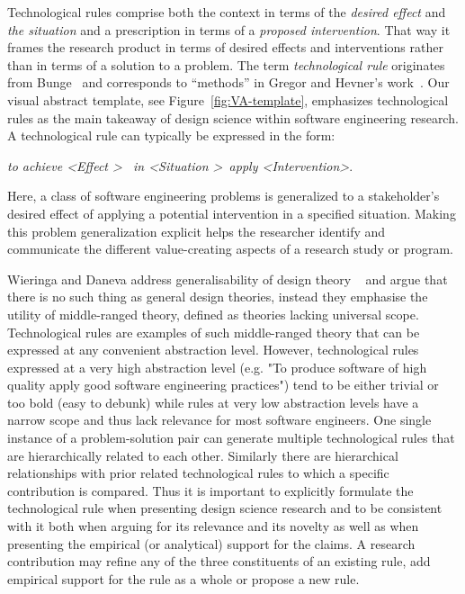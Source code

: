 \documentclass[graybox]{svmult}
\begin{document}
Technological rules comprise both the context in terms of the \emph{desired effect} and \emph{the situation} and a prescription in terms of a \emph{proposed intervention}. That way it frames the research product in terms of desired effects and interventions rather than in terms of a solution to a problem. The term \emph{technological rule} originates from Bunge~\cite{bunge_philosophy_1998} and corresponds to ``methods'' in Gregor and Hevner's work~\cite{gregor_positioning_2013}. Our visual abstract template,  see Figure~\ref{fig:VA-template}, emphasizes technological rules as the main takeaway of design science within software engineering research. A technological rule can typically be expressed in the form: 

\begin{center}{\emph{to achieve \textless Effect \textgreater ~ in \textless Situation \textgreater~apply \textless Intervention\textgreater}.} 
\newline
\end{center}

Here, a class of software engineering problems is generalized to a stakeholder's desired effect of applying a potential intervention in a specified situation. 
Making this problem generalization explicit helps the researcher identify and communicate the different value-creating aspects of a research study or program.


Wieringa and Daneva address generalisability of design theory ~\cite{wieringa_six_2015} and argue that there is no such thing as general design theories, instead they emphasise the utility of middle-ranged theory, defined as theories lacking universal scope. 
Technological rules are examples of such middle-ranged theory that can be expressed at any convenient abstraction level. However, technological rules expressed at a very high abstraction level (e.g. "To produce software of high quality apply good software engineering practices") tend to be either trivial or too bold (easy to debunk) while rules at very low abstraction levels have a narrow scope and thus lack relevance for most software engineers. One single instance of a problem-solution pair can generate multiple technological rules that are hierarchically related to each other. Similarly there are hierarchical relationships with prior related technological rules to which a specific contribution is compared.
Thus it is important to explicitly formulate the technological rule when presenting design science research and to be consistent with it both when arguing for its relevance and its novelty as well as when presenting the empirical (or analytical) support for the claims.  A research contribution may refine any of the three constituents of an existing rule, add empirical support for the rule as a whole or propose a new rule.
\end{document}
